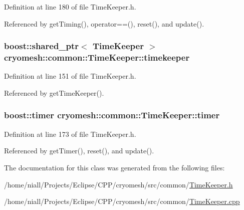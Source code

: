 \-Definition at line 180 of file \-Time\-Keeper.\-h.



\-Referenced by get\-Timing(), operator==(), reset(), and update().

\hypertarget{classcryomesh_1_1common_1_1TimeKeeper_a9182b02e3805961510f48954276ef389}{
\subsubsection[{timekeeper}]{\setlength{\rightskip}{0pt plus 5cm}boost\-::shared\-\_\-ptr$<$ {\bf \-Time\-Keeper} $>$ {\bf cryomesh\-::common\-::\-Time\-Keeper\-::timekeeper}}}\label{classcryomesh_1_1common_1_1TimeKeeper_a9182b02e3805961510f48954276ef389}


\-Definition at line 151 of file \-Time\-Keeper.\-h.



\-Referenced by get\-Time\-Keeper().

\hypertarget{classcryomesh_1_1common_1_1TimeKeeper_a41690fc156fdee825fb5e7a5e26a2102}{
\subsubsection[{timer}]{\setlength{\rightskip}{0pt plus 5cm}boost\-::timer {\bf cryomesh\-::common\-::\-Time\-Keeper\-::timer}}}\label{classcryomesh_1_1common_1_1TimeKeeper_a41690fc156fdee825fb5e7a5e26a2102}


\-Definition at line 173 of file \-Time\-Keeper.\-h.



\-Referenced by get\-Timer(), reset(), and update().



\-The documentation for this class was generated from the following files\-:\begin{DoxyCompactItemize}
\item 
/home/niall/\-Projects/\-Eclipse/\-C\-P\-P/cryomesh/src/common/\hyperlink{TimeKeeper_8h}{\-Time\-Keeper.\-h}\item 
/home/niall/\-Projects/\-Eclipse/\-C\-P\-P/cryomesh/src/common/\hyperlink{TimeKeeper_8cpp}{\-Time\-Keeper.\-cpp}\end{DoxyCompactItemize}
